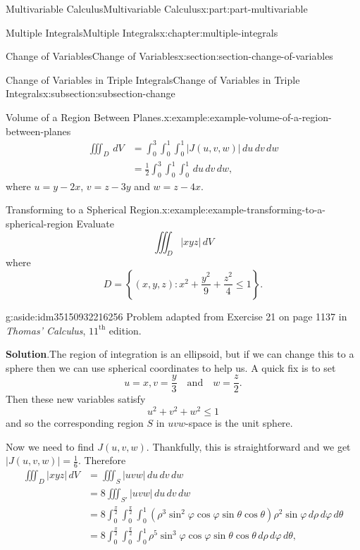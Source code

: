 \documentclass[twoside,10pt,]{tufte-book}
\newcommand{\blocktitlefont}{\relax}
\numberwithin{equation}{part}
\newcommand{\abs}[1]{\left| #1 \right|}
\newcommand{\set}[1]{\left\{ #1 \right\}}
\newcommand{\qq}[1]{\quad\text{#1}\quad}
\newcommand{\amp}{&}
\begin{document}
\begin{partptx}{Multivariable Calculus}{}{Multivariable Calculus}{}{}{x:part:part-multivariable}
\begin{chapterptx}{Multiple Integrals}{}{Multiple Integrals}{}{}{x:chapter:multiple-integrals}
\begin{sectionptx}{Change of Variables}{}{Change of Variables}{}{}{x:section:section-change-of-variables}
\begin{subsectionptx}{Change of Variables in Triple Integrals}{}{Change of Variables in Triple Integrals}{}{}{x:subsection:subsection-change}
\begin{example}{Volume of a Region Between Planes.}{x:example:example-volume-of-a-region-between-planes}
\begin{align*}
\iiint_{D}\,dV \amp = \int_{0}^{3}\int_{0}^{1}\int_{0}^{1}\abs{J(u,v,w)}\,du\,dv\,dw \\
\amp = \frac{1}{2}\int_{0}^{3}\int_{0}^{1}\int_{0}^{1}\,du\,dv\,dw \text{,}
\end{align*}
where \(u = y - 2x\), \(v = z - 3y\) and \(w = z - 4x\).%
\end{example}
\begin{example}{Transforming to a Spherical Region.}{x:example:example-transforming-to-a-spherical-region}%
Evaluate%
\begin{equation*}
\iiint_{D}\abs{xyz}\,dV
\end{equation*}
where%
\begin{equation*}
D = \set{(x,y,z) : x^{2} + \frac{y^{2}}{9} + \frac{z^{2}}{4} \leq 1}\text{.}
\end{equation*}
%
\begin{aside}{}{g:aside:idm35150932216256}%
Problem adapted from Exercise 21 on page 1137 in \emph{Thomas' Calculus}, \(11^{\text{th}}\) edition.%
\end{aside}
\par\smallskip%
\noindent\textbf{\blocktitlefont Solution}.\hypertarget{g:solution:idm35150932215104}{}\quad{}The region of integration is an ellipsoid, but if we can change this to a sphere then we can use spherical coordinates to help us. A quick fix is to set%
\begin{equation*}
u = x, v = \frac{y}{3} \qq{and} w = \frac{z}{2}\text{.}
\end{equation*}
Then these new variables satisfy%
\begin{equation*}
u^{2} + v^{2} + w^{2} \leq 1
\end{equation*}
and so the corresponding region \(S\) in \(uvw\)-space is the unit sphere.%
\par
Now we need to find \(J(u,v,w)\). Thankfully, this is straightforward and we get \(\abs{J(u,v,w)} = \frac{1}{6}\). Therefore%
\begin{align*}
\iiint_{D}\abs{xyz}\,dV \amp = \iiint_{S}\abs{uvw}\,du\,dv\,dw \\
\amp = 8\iiint_{S'}\abs{uvw}\,du\,dv\,dw \\
\amp = 8\int_{0}^{\frac{\pi}{2}}\int_{0}^{\frac{\pi}{2}}\int_{0}^{1}(\rho^{3}\sin^{2}\varphi\cos\varphi\sin\theta\cos\theta)\rho^{2}\sin\varphi\,d\rho\,d\varphi\,d\theta \\
\amp = 8\int_{0}^{\frac{\pi}{2}}\int_{0}^{\frac{\pi}{2}}\int_{0}^{1}\rho^{5}\sin^{3}\varphi\cos\varphi\sin\theta\cos\theta\,d\rho\,d\varphi\,d\theta\text{,}

\end{align*}
\end{example}
\end{subsectionptx}
\end{sectionptx}
\end{chapterptx}
\end{partptx}
\end{document}
